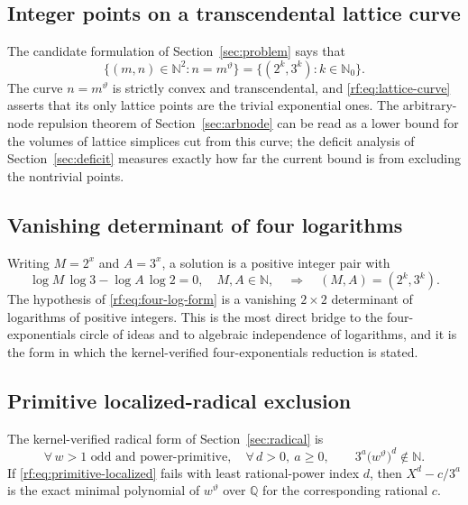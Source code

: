 \documentclass[11pt,oneside]{article}
\theoremstyle{definition}
\theoremstyle{remark}
\newcommand{\N}{\mathbb N}
\newcommand{\Nzero}{\mathbb N_0}
\newcommand{\Q}{\mathbb Q}
\newcommand{\thetaq}{\vartheta}
\begin{document}
\subsection{Integer points on a transcendental lattice curve}

The candidate formulation of Section~\ref{sec:problem} says that
\begin{equation}
 \{(m,n)\in\N^2:n=m^{\thetaq}\}
 =\{(2^k,3^k):k\in\Nzero\}.
 \label{rf:eq:lattice-curve}
\end{equation}
The curve $n=m^{\thetaq}$ is strictly convex and transcendental, and \eqref{rf:eq:lattice-curve}
asserts that its only lattice points are the trivial exponential ones.  The arbitrary-node
repulsion theorem of Section~\ref{sec:arbnode} can be read as a lower bound for the volumes of
lattice simplices cut from this curve; the deficit analysis of Section~\ref{sec:deficit}
measures exactly how far the current bound is from excluding the nontrivial points.

\subsection{Vanishing determinant of four logarithms}

Writing $M=2^x$ and $A=3^x$, a solution is a positive integer pair with
\begin{equation}
 \log M\,\log3-\log A\,\log2=0,
 \quad M,A\in\N,
 \quad\Longrightarrow\quad
 (M,A)=(2^k,3^k).
 \label{rf:eq:four-log-form}
\end{equation}
The hypothesis of \eqref{rf:eq:four-log-form} is a vanishing $2\times2$ determinant of
logarithms of positive integers.  This is the most direct bridge to the four-exponentials
circle of ideas and to algebraic independence of logarithms, and it is the form in which the
kernel-verified four-exponentials reduction is stated.

\subsection{Primitive localized-radical exclusion}

The kernel-verified radical form of Section~\ref{sec:radical} is
\begin{equation}
 \forall\,w>1\text{ odd and power-primitive},\quad
 \forall\,d>0,\ a\ge0,\qquad
 3^a\bigl(w^{\thetaq}\bigr)^d\notin\N.
 \label{rf:eq:primitive-localized}
\end{equation}
If \eqref{rf:eq:primitive-localized} fails with least rational-power index $d$, then
$X^d-c/3^a$ is the exact minimal polynomial of $w^{\thetaq}$ over $\Q$ for the corresponding
rational $c$.
\end{document}
